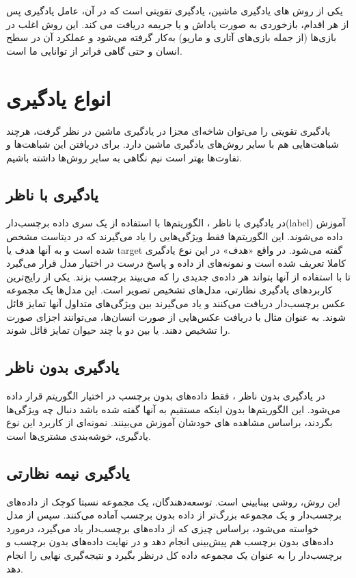 \documentclass[12pt]{report}
\begin{document}
یکی از روش های یادگیری ماشین، یادگیری تقویتی  است که در آن، عامل یادگیری پس از هر اقدام، بازخوردی به صورت پاداش و یا جریمه دریافت می کند. این روش اغلب در بازی‌ها (از جمله بازی‌های آتاری و ماریو) به‌کار گرفته می‌شود و عملکرد آن در سطح انسان و حتی گاهی فراتر از توانایی ما است.

\section{انواع یادگیری}

یادگیری تقویتی را می‌توان شاخه‌ای مجزا در یادگیری ماشین در نظر گرفت، هرچند شباهت‌هایی هم با سایر روش‌های یادگیری ماشین دارد. برای دریافتن این شباهت‌ها و تفاوت‌ها بهتر است نیم نگاهی به سایر روش‌ها داشته باشیم.

\subsection{یادگیری با ناظر }
در یادگیری با ناظر ، الگوریتم‌ها با استفاده از یک سری داده برچسب‌دار(label) آموزش داده می‌شوند. این الگوریتم‌ها فقط ویژگی‌هایی را یاد می‌گیرند که در دیتاست مشخص شده است و به آنها هدف یا target گفته می‌شود. در واقع «هدف» در این نوع یادگیری کاملا تعریف شده است و نمونه‌های از داده و پاسخ درست در اختیار مدل قرار می‌گیرد تا با استفاده از آنها بتواند هر داده‌ی جدیدی را که می‌بیند برچسب بزند. یکی از رایج‌ترین کاربردهای یادگیری نظارتی، مدل‌های تشخیص تصویر است. این مدل‌ها یک مجموعه عکس برچسب‌دار دریافت می‌کنند و یاد می‌گیرند بین ویژگی‌های متداول آنها تمایز قائل شوند. به عنوان مثال با دریافت عکس‌هایی از صورت انسان‌ها، می‌توانند اجزای صورت را تشخیص دهند. یا بین دو یا چند حیوان تمایز قائل شوند.

\subsection{یادگیری بدون ناظر }
در یادگیری بدون ناظر ، فقط داده‌های بدون برچسب در اختیار الگوریتم قرار داده می‌شود. این الگوریتم‌ها بدون اینکه مستقیم به آنها گفته شده باشد دنبال چه ویژگی‌ها بگردند، براساس مشاهده های خودشان آموزش می‌بینند. نمونه‌ای از کاربرد این نوع یادگیری، خوشه‌بندی مشتری‌ها است.

\subsection{یادگیری نیمه نظارتی }
این روش، روشی بینابینی است. توسعه‌دهندگان، یک مجموعه نسبتا کوچک از داد‌ه‌های برچسب‌‌دار و یک مجموعه بزرگ‌تر از داده بدون برچسب آماده می‌کنند. سپس از مدل خواسته می‌شود، براساس چیزی که از داده‌های برچسب‌دار یاد می‌گیرد، درمورد داده‌های بدون برچسب هم پیش‌بینی انجام دهد و در نهایت داده‌های بدون برچسب و برچسب‌دار را به عنوان یک مجموعه داده کل درنظر بگیرد و نتیجه‌گیری نهایی را انجام دهد.
\end{document}
